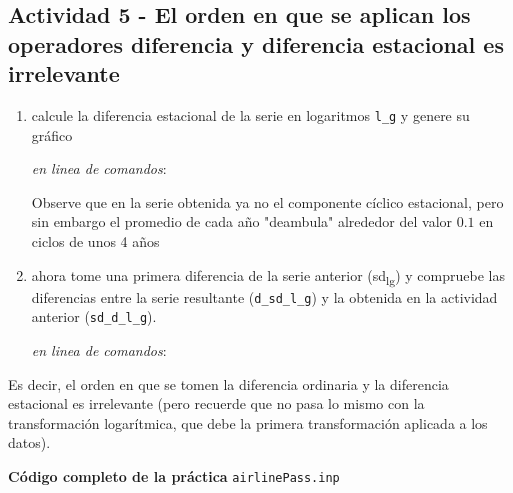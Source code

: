 \documentclass[11pt]{article}
\begin{document}
\subsection{Actividad 5 - El orden en que se aplican los operadores diferencia y diferencia estacional es irrelevante}
\label{sec:orga293d5e}

\begin{enumerate}
\item calcule la diferencia estacional de la serie en logaritmos \texttt{l\_g} y
genere su gráfico

{\vspace{0pt} \footnotesize \color{gray!70!black}
\emph{en linea de comandos}: 
}

Observe que en la serie obtenida ya no el componente cíclico
estacional, pero sin embargo el promedio de cada año "deambula"
alrededor del valor \(0.1\) en ciclos de unos 4 años

\item ahora tome una primera diferencia de la serie anterior (sd\textsubscript{l}\textsubscript{g}) y
compruebe las diferencias entre la serie resultante (\texttt{d\_sd\_l\_g}) y
la obtenida en la actividad anterior (\texttt{sd\_d\_l\_g}).

{\vspace{0pt} \footnotesize \color{gray!70!black}
\emph{en linea de comandos}: 
}
\end{enumerate}

Es decir, el orden en que se tomen la diferencia ordinaria y la
diferencia estacional es irrelevante (pero recuerde que no pasa lo
mismo con la transformación logarítmica, que debe la primera
transformación aplicada a los datos).

\vspace{10pt}
\noindent
\textbf{Código completo de la práctica} \texttt{airlinePass.inp}
\vspace{10pt}

\clearpage
\end{document}
